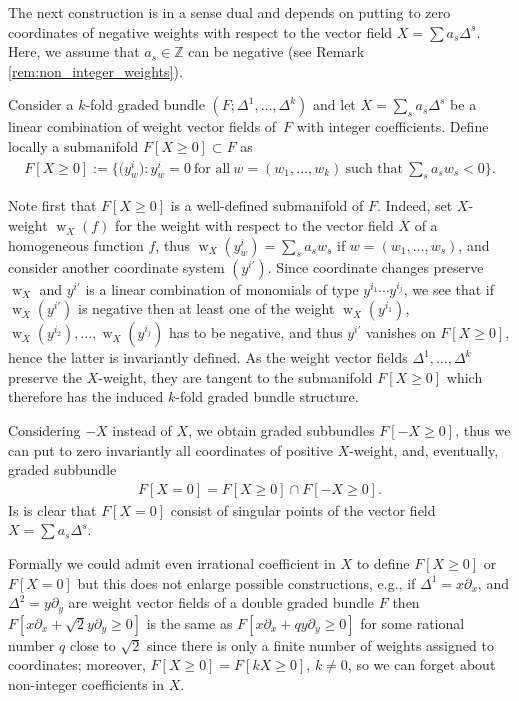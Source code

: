 \documentclass[pdftex]{sigma}
\DeclareMathOperator{\w}{w}
\newcommand{\Zet}{{\mathbb Z}}
\newcommand{\pa}{\partial}
\numberwithin{equation}{section}
\begin{document}
The next construction is in a sense dual and depends on putting to zero coordinates of negative weights with respect to the vector f\/ield $X=\sum a_s \Delta^s$. Here, we assume that $a_s\in \Zet$ can be negative (see Remark \ref{rem:non_integer_weights}).
\begin{Definition}\label{def:removal_coordinates2} Consider a $k$-fold graded bundle $(F; \Delta^1, \ldots, \Delta^k)$ and let $X=\sum_s a_s \Delta^s$ be a linear combination of weight vector f\/ields of~$F$ with integer coef\/f\/icients. Def\/ine locally a submanifold $F[X\geq 0] \subset F$ as
\begin{gather*}
 F[X\geq 0]:= \bigg\{\big(y^i_w\big)\colon y^i_w=0 \  \text{for all} \  w=(w_1, \ldots, w_k)\  \text{such that}\  \sum_s a_s w_s < 0\bigg\}.
\end{gather*}
\end{Definition}

Note f\/irst that $F[X\geq 0]$ is a well-def\/ined submanifold of $F$. Indeed, set $X$-weight $\w_X(f)$ for the weight with respect to the vector f\/ield $X$ of a homogeneous function $f$, thus $\w_X(y^i_w) = \sum_s a_s w_s$ if $w=(w_1, \ldots, w_s)$, and consider another coordinate system $(y^{i'})$. Since coordinate changes preserve $\w_X$ and $y^{i'}$ is a linear combination of monomials of type $y^{i_1}\cdots y^{i_j}$, we see that if $\w_X(y^{i'})$ is negative then at least one of the weight $\w_X(y^{i_1})$, $\w_X(y^{i_2}), \ldots, \w_X(y^{i_j})$ has to be negative, and thus $y^{i'}$ vanishes on $F[X\geq 0]$, hence the latter is invariantly def\/ined. As the weight vector f\/ields $\Delta^1, \ldots, \Delta^k$ preserve the $X$-weight, they are tangent to the submanifold $F[X\geq 0]$ which therefore has the induced $k$-fold graded bundle structure.

Considering $-X$ instead of $X$, we obtain graded subbundles $F[-X\ge 0]$, thus we can put to zero invariantly all coordinates of positive $X$-weight, and, eventually, graded subbundle \begin{gather*}
F[X=0] = F[X\geq 0] \cap F[-X\geq 0].
\end{gather*}
Is is clear that $F[X=0]$ consist of singular points of the vector f\/ield $X = \sum a_s \Delta^s$.

\begin{Remark}\label{rem:non_integer_weights} Formally we could admit even irrational coef\/f\/icient in $X$ to def\/ine $F[X\geq 0]$ or $F[X=0]$ but this does not enlarge possible constructions, e.g., if $\Delta^1 = x \pa_x$, and $\Delta^2 = y\pa_y$ are weight vector f\/ields of a double graded bundle $F$ then $F[x\pa_x + \sqrt{2} y \pa_y\geq 0]$ is the same as $F[x\pa_x + q y \pa_y\geq 0]$ for some rational number $q$ close to $\sqrt{2}$ since there is only a f\/inite number of weights assigned to coordinates; moreover, $F[X\geq 0] = F[k X\geq 0]$, $k\neq 0$, so we can forget about non-integer coef\/f\/icients in $X$.
\end{Remark}
\end{document}
